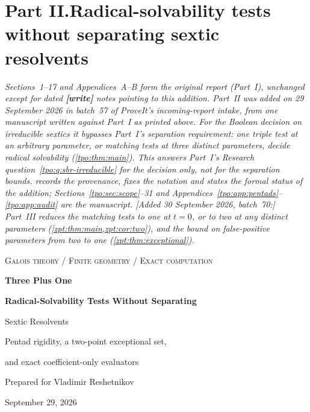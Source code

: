 \documentclass[11pt,letterpaper]{article}
\numberwithin{equation}{section}
\theoremstyle{definition}
\theoremstyle{remark}
\begin{document}
\clearpage
\setcounter{section}{17}
\renewcommand{\thesection}{\arabic{section}}
\makeatletter\gdef{}\gdef{}\makeatother
{}\part*{Part II.\quad Radical-solvability tests without separating sextic resolvents}

\noindent\emph{Sections~1--17 and Appendices~A--B form the original report
(Part~I), unchanged except for dated \textbf{[write]} notes pointing to
this addition. Part~II was added on 29 September 2026 in batch~57 of
ProveIt's incoming-report intake, from one manuscript written against
Part~I as printed above. For the Boolean decision on irreducible sextics it
bypasses Part~I's separation requirement: one triple test at an arbitrary
parameter, or matching tests at three distinct parameters, decide radical
solvability (\cref{tpo:thm:main}). This answers Part~I's Research
question~\ref{tpo:q:sbr-irreducible} for the decision only, not for the
separation bounds.  records the provenance, fixes the
notation and states the formal status of the addition;
Sections~\ref{tpo:sec:scope}--31 and
Appendices~\ref{tpo:app:pentads}--\ref{tpo:app:audit} are the manuscript.
[Added 30 September 2026, batch~70:] Part~III reduces the matching tests to
one at $t=0$, or to two at any distinct parameters
(\cref{zpt:thm:main,zpt:cor:two}), and the bound on false-positive
parameters from two to one (\cref{zpt:thm:exceptional}).}

\begin{center}
{\color{MidnightBlue}\large\scshape Galois theory / Finite geometry / Exact computation\par}
\vspace{0.2in}
{\LARGE\bfseries Three Plus One\par}
\vspace{0.08in}
{\Large\bfseries Radical-Solvability Tests Without Separating\par Sextic Resolvents\par}
\vspace{0.12in}
{\large Pentad rigidity, a two-point exceptional set,\par and exact coefficient-only evaluators\par}
\vspace{0.12in}
{Prepared for Vladimir Reshetnikov\par September 29, 2026\par}
\end{center}
\end{document}

